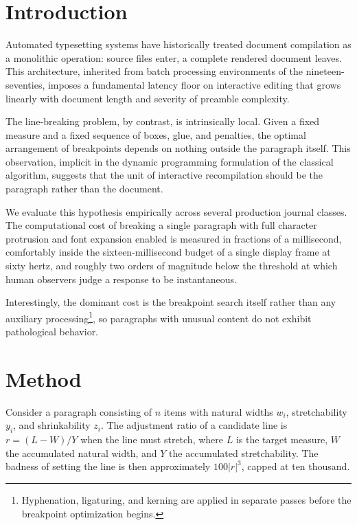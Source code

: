 \section{Introduction}

Automated typesetting systems have historically treated document compilation
as a monolithic operation: source files enter, a complete rendered document
leaves. This architecture, inherited from batch processing environments of
the nineteen-seventies, imposes a fundamental latency floor on interactive
editing that grows linearly with document length and severity of preamble
complexity.

The line-breaking problem, by contrast, is intrinsically local. Given a fixed
measure and a fixed sequence of boxes, glue, and penalties, the optimal
arrangement of breakpoints depends on nothing outside the paragraph itself.
This observation, implicit in the dynamic programming formulation of the
classical algorithm, suggests that the unit of interactive recompilation
should be the paragraph rather than the document.

We evaluate this hypothesis empirically across several production journal
classes. The computational cost of breaking a single paragraph with full
character protrusion and font expansion enabled is measured in fractions of
a millisecond, comfortably inside the sixteen-millisecond budget of a single
display frame at sixty hertz, and roughly two orders of magnitude below the
threshold at which human observers judge a response to be instantaneous.

Interestingly, the dominant cost is the breakpoint search itself rather than
any auxiliary processing\footnote{Hyphenation, ligaturing, and kerning are
applied in separate passes before the breakpoint optimization begins.}, so
paragraphs with unusual content do not exhibit pathological behavior.

\section{Method}

Consider a paragraph consisting of $n$ items with natural widths $w_i$,
stretchability $y_i$, and shrinkability $z_i$. The adjustment ratio of a
candidate line is $r = (L - W)/Y$ when the line must stretch, where $L$ is
the target measure, $W$ the accumulated natural width, and $Y$ the
accumulated stretchability. The badness of setting the line is then
approximately $100|r|^3$, capped at ten thousand.

